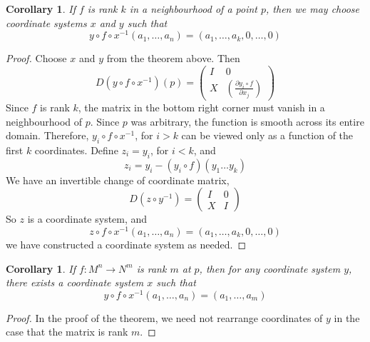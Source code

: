 \documentclass[12pt]{report}
\theoremstyle{plain}
\newtheorem{corollary}[theorem]{Corollary}
\theoremstyle{definition}
\begin{document}
\begin{corollary}
    If $f$ is rank $k$ in a neighbourhood of a point $p$, then we may choose coordinate systems $x$ and $y$ such that
    \[ y \circ f \circ x^{-1}(a_1, \dots, a_n) = (a_1, \dots, a_k, 0, \dots, 0) \]
\end{corollary}
\begin{proof}
    Choose $x$ and $y$ from the theorem above. Then
    \[ D(y \circ f \circ x^{-1})(p) = \begin{pmatrix} I & 0 \\ X & \left( \frac{\partial y_i \circ f}{\partial x_j} \right) \end{pmatrix} \]
    Since $f$ is rank $k$, the matrix in the bottom right corner must vanish in a neighbourhood of $p$. Since $p$ was arbitrary, the function is smooth across its entire domain. Therefore, $y_i \circ f \circ x^{-1}$, for $i > k$ can be viewed only as a function of the first $k$ coordinates. Define $z_i = y_i$, for $i < k$, and
    \[ z_i = y_i - (y_i \circ f)(y_1 \dots y_k) \]
    We have an invertible change of coordinate matrix,
    \[ D(z \circ y^{-1}) = \begin{pmatrix} I & 0 \\ X & I \end{pmatrix} \]
    So $z$ is a coordinate system, and
    \[ z \circ f \circ x^{-1}(a_1, \dots, a_n) = (a_1, \dots, a_k, 0, \dots, 0) \]
    we have constructed a coordinate system as needed.
\end{proof}

\begin{corollary}
    If $f: M^n \to N^m$ is rank $m$ at $p$, then for any coordinate system $y$, there exists a coordinate system $x$ such that
    \[ y \circ f \circ x^{-1} (a_1, \dots, a_n) = (a_1, \dots, a_m) \]
\end{corollary}
\begin{proof}
    In the proof of the theorem, we need not rearrange coordinates of $y$ in the case that the matrix is rank $m$.
\end{proof}
\end{document}
